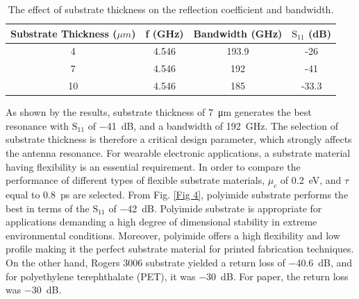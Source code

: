 \documentclass[12pt]{suhbook}
\begin{document}
% 
% 
\begin{table}[hbt!]
\centering
 \begin{tabular}{|c |c |c |c|} 
 \hline
Substrate Thickness ($\mu m$) & f (GHz) & Bandwidth (GHz) &  $\mathrm{S_{11}}$ (dB) \\ [0.5ex] 
 \hline
4 & 4.546 & 193.9  & -26  \\ 
 \hline
7 & 4.546  & 192  & -41  \\
 \hline
 10 & 4.546  & 185  & -33.3 \\ 
 \hline
\end{tabular}
\caption{The effect of substrate thickness on the reflection coefficient and bandwidth.}
\label{table:2}
\end{table}
% 
As shown by the results, substrate thickness of \SI{7}{\um} generates the best resonance with $\mathrm{S_{11}}$ of \SI{-41}{\dB}, and a bandwidth of \SI{192}{\GHz}. The selection of substrate thickness is therefore a critical design parameter, which strongly affects the antenna resonance. For wearable electronic applications, a substrate material having flexibility is an essential requirement. In order to compare the performance of different types of flexible substrate materials, $\mu_c$ of \SI{0.2}{\eV}, and $\tau$ equal to \SI{0.8}{\ps} are selected. From Fig. \ref{Fig 4}, polyimide substrate performs the best in terms of the $\mathrm{S_{11}}$ of \SI{-42}{\dB}. Polyimide substrate is appropriate for applications demanding a high degree of dimensional stability in extreme environmental conditions. Moreover, polyimide offers a high flexibility and low profile making it the perfect substrate material for printed fabrication techniques. On the other hand, Rogers 3006 substrate yielded a return loss of  \SI{-40.6}{\dB}, and for polyethylene terephthalate (PET), it was \SI{-30}{\dB}. For paper, the return loss was \SI{-30}{\dB}. 
\end{document}
